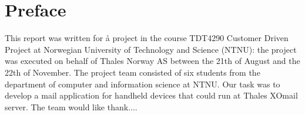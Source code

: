 \chapter*{Preface}

This report was written for å project in the course TDT4290 Customer Driven Project at Norwegian University of Technology and Science (NTNU): the project was executed on behalf of Thales Norway AS between the 21th of August and the 22th of November.
\newline
\newline
The project team consisted of six students from the department of computer and information science at NTNU. Our task was to develop a mail application for handheld devices that could run at Thales XOmail server.
\newline
\newline
The team would like thank....
